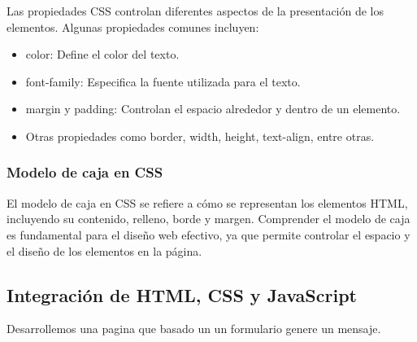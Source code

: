 \documentclass[executivepaper]{article}
\begin{document}
Las propiedades CSS controlan diferentes aspectos de la presentación de los elementos. Algunas propiedades comunes incluyen:

\begin{itemize}
  \item color: Define el color del texto.
  \item font-family: Especifica la fuente utilizada para el texto.
  \item margin y padding: Controlan el espacio alrededor y dentro de un elemento.
  \item Otras propiedades como border, width, height, text-align, entre otras.
\end{itemize}

\subsubsection*{Modelo de caja en CSS}
El modelo de caja en CSS se refiere a cómo se representan los elementos HTML, incluyendo su contenido, relleno, borde y margen. Comprender el modelo de caja es fundamental para el diseño web efectivo, ya que permite controlar el espacio y el diseño de los elementos en la página.


\subsection{Integración de HTML, CSS y JavaScript}
Desarrollemos una pagina que basado un un formulario genere un mensaje.
\end{document}
